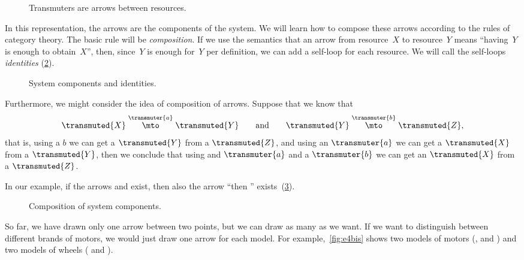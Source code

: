 
\begin{figure}[h!]
  \centering
  \caption{Transmuters are arrows between resources.}
   \label{fig:e2}
\end{figure}

In this representation, the arrows are the components of the system.
We will learn how to compose these arrows according to the rules of category theory.
The basic rule will be \emph{composition}.
If we use the semantics that an arrow from resource~$X$ to resource~$Y$ means ``having~$Y$ is
enough to obtain~$X$'', then, since~$Y$ is enough for~$Y$ per definition, we can add a self-loop for each
resource. We will call the self-loops \emph{identities} (\cref{fig:e3}).

\begin{figure}[h!]
  \centering
  \caption{System components and identities. }
  \label{fig:e3}
\end{figure}

Furthermore, we might consider the idea of composition of arrows.
Suppose that we know that
\begin{equation*}
  \transmuted{X} \stackrel{\transmuter{a}}{\mto} \transmuted{Y}
  \qquad \text{and} \qquad
  \transmuted{Y} \stackrel{\transmuter{b}}{\mto} \transmuted{Z},
\end{equation*}
that is, using a $b$ we can get a $\transmuted{Y}$ from a $\transmuted{Z}$, and using an $\transmuter{a}$ we can get a $\transmuted{X}$ from a $\transmuted{Y}$,
then we conclude that using and $\transmuter{a}$ and a $\transmuter{b}$ we can get an $\transmuted{X}$ from a $\transmuted{Z}$.

In our example, if the arrows \wheels  and \motor exist, then also the arrow ``\wheels then \motor'' exists~(\cref{fig:e4}).

\begin{figure}[h!]
  \centering
  \caption{Composition of system components. }
  \label{fig:e4}
\end{figure}

So far, we have drawn only one arrow between two points, but we can draw as many as we want.
If we want to distinguish between different brands of motors, we would just draw
one arrow for each model. For example,~\cref{fig:e4bis} shows two models of
motors (, and ) and two models of wheels
( and ).


